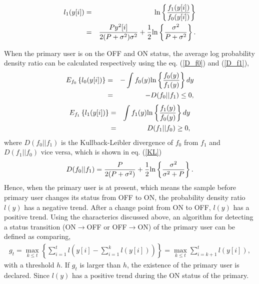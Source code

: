 \begin{eqnarray}
l_{1}(y[i]) &=& {\rm ln}\left\{\frac{f_1(y[i])}{f_0(y[i])}\right\} \label{like2} \\ 
&=& \frac{Py^2[i]}{2(P+\sigma^2)\sigma^2} + \frac{1}{2}{\rm ln}\left\{\frac{\sigma^2}{P+\sigma^2}\right\}. \nonumber
\end{eqnarray}

When the primary user is on the OFF and ON status, the average log probability density ratio can be calculated respectively using the eq. (\ref{D_f0}) and (\ref{D_f1}),
\begin{eqnarray}
E_{f_0}\left\{l_0(y[i])\right\} &=& -\int f_0(y){\rm ln}\left\{\frac{f_0(y)}{f_1(y)}\right\}dy \nonumber \\ 
&=&-D(f_0||f_1)\leq 0, \label{D_f0} 
\end{eqnarray}
\begin{eqnarray}
E_{f_1}\left\{l_1(y[i])\right\} &=& \int f_1(y){\rm ln}\left\{\frac{f_1(y)}{f_0(y)}\right\}dy \nonumber \\
&=& D(f_1||f_0)\geq 0 \label{D_f1},
\end{eqnarray}
where $D(f_0||f_1)$ is the Kullback-Leibler divergence of $f_0$ from $f_1$ and $D(f_1||f_0)$ vice versa, which is shown in eq. (\ref{KL})
\begin{eqnarray}
D(f_0||f_1)=\frac{P}{2(P+\sigma^2)}+\frac{1}{2}{\rm ln}\left\{\frac{\sigma^2}{\sigma^2+P}\right\}.
\label{KL}
\end{eqnarray}
Hence, when the primary user is at present, which means the sample before primary user changes its status from OFF to ON, the probability density ratio $l(y)$ has a negative trend. After a change point from ON to OFF, $l(y)$ has a positive trend.
Using the characterics discussed above, an algorithm for detecting a status transition (ON$\rightarrow$OFF or OFF$\rightarrow$ON) of the primary user can be defined as comparing,  
\begin{eqnarray}
g_t =  \max_{k \leq t}\left\{\sum_{i=1}^tl(y[i]-\sum_{i=1}^kl(y[i]))\right\}=\max_{k \leq t}\sum_{i=k+1}^tl(y[i]),
\label{Cusum}
\end{eqnarray}
with a threshold $h$. If $g_t$ is larger than $h$, the existence of the primary user is declared. Since $l(y)$ has a positive trend during the ON status of the primary.

